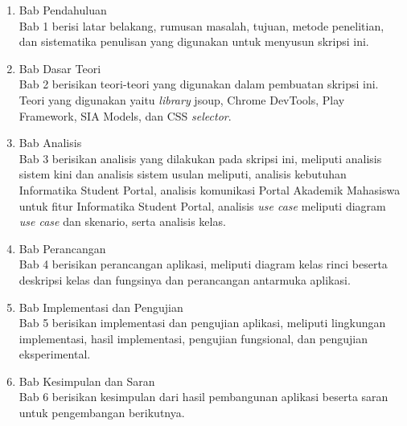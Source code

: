 \begin{enumerate}
  \item Bab Pendahuluan \\
  Bab 1 berisi latar belakang, rumusan masalah, tujuan, metode penelitian,
  dan sistematika penulisan yang digunakan untuk menyusun skripsi ini.
  \item Bab Dasar Teori \\
  Bab 2 berisikan teori-teori yang digunakan dalam pembuatan skripsi ini. Teori
  yang digunakan yaitu \textit{library} jsoup, Chrome DevTools, Play Framework, SIA Models, dan CSS \textit{selector}.
  \item Bab Analisis \\
  Bab 3 berisikan analisis yang dilakukan pada skripsi ini, meliputi analisis sistem kini dan analisis sistem usulan meliputi, analisis kebutuhan Informatika Student Portal, analisis komunikasi Portal Akademik Mahasiswa untuk fitur Informatika Student Portal, analisis \textit{use case} meliputi diagram \textsl{use case} dan skenario, serta analisis kelas. 
	\item Bab Perancangan \\
  Bab 4 berisikan perancangan aplikasi, meliputi diagram kelas rinci beserta deskripsi kelas dan fungsinya dan perancangan antarmuka aplikasi. 
	\item Bab Implementasi dan Pengujian \\
  Bab 5 berisikan implementasi dan pengujian aplikasi, meliputi lingkungan implementasi, hasil implementasi, pengujian fungsional, dan pengujian eksperimental.
	\item Bab Kesimpulan dan Saran \\
  Bab 6 berisikan kesimpulan dari hasil pembangunan aplikasi beserta saran untuk pengembangan berikutnya.
\end{enumerate}
